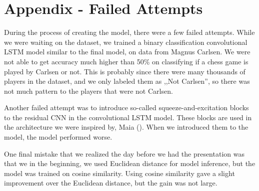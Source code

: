 \section*{Appendix - Failed Attempts}
During the process of creating the model, there were a few failed attempts. While we were waiting on the dataset, we trained a binary classification convolutional LSTM model similar to the final model, on data from Magnus Carlsen. We were not able to get accuracy much higher than 50\% on classifying if a chess game is played by Carlsen or not. This is probably since there were many thousands of players in the dataset, and we only labeled them as ,,Not Carlsen'', so there was not much pattern to the players that were not Carlsen.
\medskip\par
Another failed attempt was to introduce so-called squeeze-and-excitation blocks to the residual CNN in the convolutional LSTM model. These blocks are used in the architecture we were inspired by, Maia (\citealp{maia}). When we introduced them to the model, the model performed worse.
\medskip\par
One final mistake that we realized the day before we had the presentation was that we in the beginning, we used Euclidean distance for model inference, but the model was trained on cosine similarity. Using cosine similarity gave a slight improvement over the Euclidean distance, but the gain was not large.